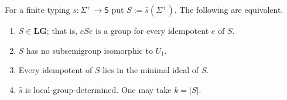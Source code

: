 \begin{theorem}
\label{thm:lg-characterization}
For a finite typing $s:\Sigma^+\to\mathsf S$ put $S:=\widehat{s}(\Sigma^+)$.
The following are equivalent.
\begin{enumerate}[label=\textup{(\roman*)},leftmargin=*]
\item $S\in\mathbf{LG}$; that is, $eSe$ is a group for every idempotent
$e$ of $S$.
\item $S$ has no subsemigroup isomorphic to $U_1$.
\item Every idempotent of $S$ lies in the minimal ideal of $S$.
\item $\widehat{s}$ is local-group-determined.  One may take $k=|S|$.
\end{enumerate}
\end{theorem}

